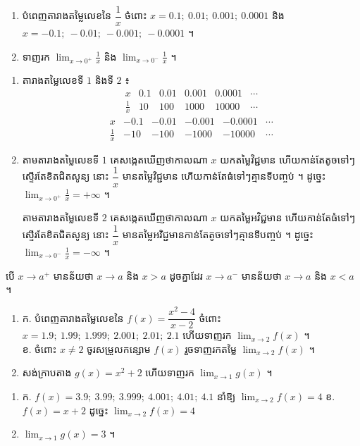 \begin{example}[លំហាត់គំរូ]
\begin{enumerate}[a]
  \item បំពេញតារាងតម្លៃលេខនៃ $\dfrac{1}{x}$ ចំពោះ $x = 0.1;\ 0.01;\ 0.001;\ 0.0001$ និង $x = -0.1;\ -0.01;\ -0.001;\ -0.0001$ ។
  \item ទាញរក $\displaystyle\lim_{x \to 0^+}\frac{1}{x}$ និង $\displaystyle\lim_{x \to 0^-}\frac{1}{x}$ ។
\end{enumerate}
\end{example}
\ans
\begin{enumerate}[a]
  \item តារាងតម្លៃលេខទី $1$ និងទី $2$ ៖
  \[
  \begin{array}{c|ccccc}
  x & 0.1 & 0.01 & 0.001 & 0.0001 & \cdots\\ \hline
  \frac{1}{x} & 10 & 100 & 1000 & 10000 & \cdots
  \end{array}
  \]
  \[
  \begin{array}{c|ccccc}
  x & -0.1 & -0.01 & -0.001 & -0.0001 & \cdots\\ \hline
  \frac{1}{x} & -10 & -100 & -1000 & -10000 & \cdots
  \end{array}
  \]
  \item តាមតារាងតម្លៃលេខទី $1$ គេសង្កេតឃើញថាកាលណា $x$ យកតម្លៃវិជ្ជមាន ហើយកាន់តែតូចទៅៗស្ទើរតែខិតជិតសូន្យ នោះ $\dfrac{1}{x}$ មានតម្លៃវិជ្ជមាន ហើយកាន់តែធំទៅៗគ្មានទីបញ្ចប់ ។ ដូច្នេះ $\displaystyle\lim_{x \to 0^+}\frac{1}{x} = +\infty$ ។

  តាមតារាងតម្លៃលេខទី $2$ គេសង្កេតឃើញថាកាលណា $x$ យកតម្លៃអវិជ្ជមាន ហើយកាន់តែធំទៅៗស្ទើរតែខិតជិតសូន្យ នោះ $\dfrac{1}{x}$ មានតម្លៃអវិជ្ជមានកាន់តែតូចទៅៗគ្មានទីបញ្ចប់ ។ ដូច្នេះ $\displaystyle\lim_{x \to 0^-}\frac{1}{x} = -\infty$ ។
\end{enumerate}

\begin{note}[សម្គាល់]
បើ $x \to a^+$ មានន័យថា $x \to a$ និង $x > a$ ដូចគ្នាដែរ $x \to a^-$ មានន័យថា $x \to a$ និង $x < a$ ។
\end{note}

\begin{pro}
\begin{enumerate}[1]
  \item ក. បំពេញតារាងតម្លៃលេខនៃ $f(x) = \dfrac{x^2 - 4}{x - 2}$ ចំពោះ $x = 1.9;\ 1.99;\ 1.999;\ 2.001;\ 2.01;\ 2.1$ ហើយទាញរក $\displaystyle\lim_{x \to 2} f(x)$ ។ \\ ខ. ចំពោះ $x \ne 2$ ចូរសម្រួលកន្សោម $f(x)$ រួចទាញរកតម្លៃ $\displaystyle\lim_{x \to 2} f(x)$ ។
  \item សង់ក្រាបតាង $g(x) = x^2 + 2$ ហើយទាញរក $\displaystyle\lim_{x \to 1} g(x)$ ។
\end{enumerate}
\ans
\begin{enumerate}[1]
  \item ក. $f(x) = 3.9;\ 3.99;\ 3.999;\ 4.001;\ 4.01;\ 4.1$ នាំឱ្យ $\displaystyle\lim_{x \to 2} f(x) = 4$ \quad ខ. $f(x) = x + 2$ ដូច្នេះ $\displaystyle\lim_{x \to 2} f(x) = 4$
  \item $\displaystyle\lim_{x \to 1} g(x) = 3$ ។
\end{enumerate}
\end{pro}

